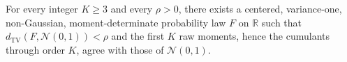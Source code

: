 For every integer \(K\ge3\) and every \(\rho>0\), there exists a centered, variance-one, non-Gaussian, moment-determinate probability law \(F\) on \(\mathbb R\) such that \(d_{\mathrm{TV}}(F,\mathcal N(0,1))<\rho\) and the first \(K\) raw moments, hence the cumulants through order \(K\), agree with those of \(\mathcal N(0,1)\).